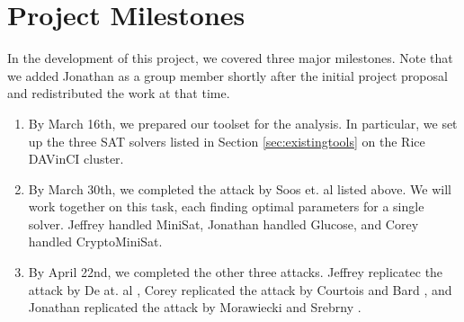 \appendix
\section{Project Milestones}
\label{sec:milestones}

In the development of this project, we covered three major milestones. Note that we added Jonathan as a group member shortly after the initial project proposal and redistributed the work at that time.
\begin{enumerate}
	\item By March 16th, we prepared our toolset for the analysis. In particular, we set up the three SAT solvers listed in Section \ref{sec:existingtools} on the Rice DAVinCI cluster.
	
	\item By March 30th, we completed the attack by Soos et. al \cite{SNC09} listed above. We will work together on this task, each finding optimal parameters for a single solver. Jeffrey handled MiniSat, Jonathan handled Glucose, and Corey handled CryptoMiniSat.
	
	\item By April 22nd, we completed the other three attacks. Jeffrey replicatec the attack by De at. al \cite{DKV07}, Corey replicated the attack by Courtois and Bard \cite{CB07}, and Jonathan replicated the attack by Morawiecki and Srebrny \cite{MS13}.
\end{enumerate}